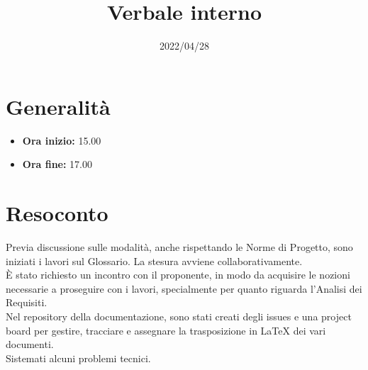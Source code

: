 \documentclass{classes/base}
\title{Verbale interno}
\date{2022/04/28}
\author{\marcov}
\renewcommand{\maketitle}{
    
}
\begin{document}
    \maketitle

    \section*{Generalità}
    \begin{itemize}
        \item \textbf{Ora inizio:} 15.00
        \item \textbf{Ora fine:} 17.00
    \end{itemize}

    \section*{Resoconto}
    Previa discussione sulle modalità, anche rispettando le Norme di Progetto, sono iniziati i lavori sul Glossario. La stesura avviene collaborativamente.\\
    È stato richiesto un incontro con il proponente, in modo da acquisire le nozioni necessarie a proseguire con i lavori, specialmente per quanto riguarda l'Analisi dei Requisiti.\\
    Nel repository della documentazione, sono stati creati degli issues e una project board per gestire, tracciare e assegnare la trasposizione in \LaTeX{} dei vari documenti.\\
    Sistemati alcuni problemi tecnici.
\end{document}
